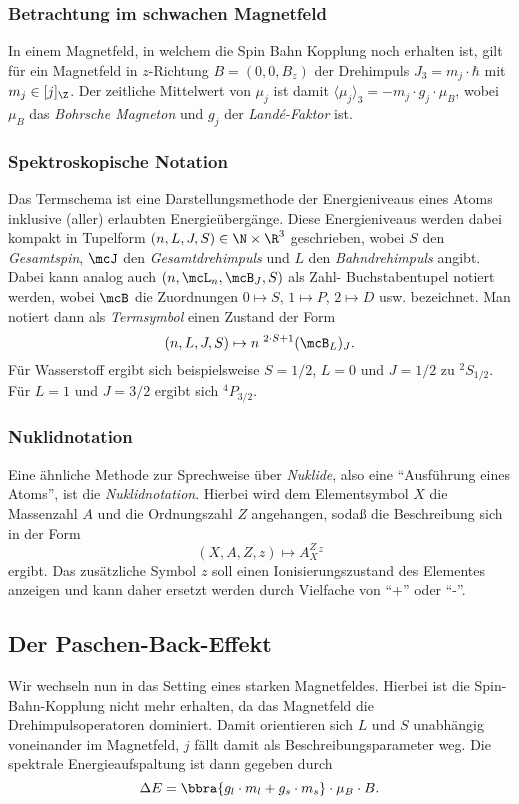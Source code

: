 \documentclass{subfiles}
\begin{document}

    \subsubsection*{Betrachtung im schwachen Magnetfeld}
        In einem Magnetfeld, in welchem die Spin Bahn Kopplung noch erhalten ist, gilt für ein Magnetfeld in $z$-Richtung $B = (0,0,B_z)$ der Drehimpuls $J_3 = m_j\cdot\hbar$ mit $m_j\in[j]_\Z$. Der zeitliche Mittelwert von $\mu_j$ ist damit $\langle\mu_j\rangle_3 = -m_j\cdot g_j\cdot\mu_B$, wobei $\mu_B$ das \emph{Bohrsche Magneton} und $g_j$ der \emph{Landé-Faktor} ist. 
        
    \subsubsection*{Spektroskopische Notation}
        Das Termschema ist eine Darstellungsmethode der Energieniveaus eines Atoms inklusive (aller) erlaubten Energieübergänge. Diese Energieniveaus werden dabei kompakt in Tupelform $(n,L,J,S)\in\N\times\R^3$ geschrieben, wobei $S$ den \emph{Gesamtspin}, $\mcJ$ den \emph{Gesamtdrehimpuls} und $L$ den \emph{Bahndrehimpuls} angibt. Dabei kann analog auch $(n,\mcL_n,\mcB_J,S)$ als Zahl- Buchstabentupel notiert werden, wobei $\mcB$ die Zuordnungen $0\mapsto S$, $1\mapsto P$, $2\mapsto D$ usw. bezeichnet. Man notiert dann als \emph{Termsymbol} einen Zustand der Form
        \[
            (n,L,J,S) \mapsto n\;^{2\cdot S + 1}(\mcB_L)_J. 
        \]
        Für Wasserstoff ergibt sich beispielsweise $S = 1/2$, $L = 0$ und $J = 1/2$ zu $^2S_{1/2}$. Für $L = 1$ und $J = 3/2$ ergibt sich $^4P_{3/2}$.

    \subsubsection*{Nuklidnotation}
        Eine ähnliche Methode zur Sprechweise über \emph{Nuklide}, also eine \enquote{Ausführung eines Atoms}, ist die \emph{Nuklidnotation}. Hierbei wird dem Elementsymbol $X$ die Massenzahl $A$ und die Ordnungszahl $Z$ angehangen, sodaß die Beschreibung sich in der Form
        \[
            (X,A,Z,z)\mapsto A^Z_X^z
        \]
        ergibt. Das zusätzliche Symbol $z$ soll einen Ionisierungszustand des Elementes anzeigen und kann daher ersetzt werden durch Vielfache von \enquote{+} oder \enquote{-}.  

    \subsection{Der Paschen-Back-Effekt}
        Wir wechseln nun in das Setting eines starken Magnetfeldes. Hierbei ist die Spin-Bahn-Kopplung nicht mehr erhalten, da das Magnetfeld die Drehimpulsoperatoren dominiert. Damit orientieren sich $L$ und $S$ unabhängig voneinander im Magnetfeld, $j$ fällt damit als Beschreibungsparameter weg. Die spektrale Energieaufspaltung ist dann gegeben durch
        \[
            \Delta E = \bbra{g_l\cdot m_l + g_s\cdot m_s}\cdot\mu_B\cdot B.
        \]
        

    
\end{document}
